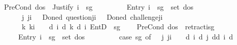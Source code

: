 \begin{isabellebody}
\ \ {\isacharbar}{\kern0pt}\ {\isachardoublequoteopen}PreCond\ dos\ {\isasymGamma}\ {\isacharparenleft}{\kern0pt}Justify\ i\ {\isasymPhi}\ sg\ {\isasymphi}{\isacharparenright}{\kern0pt}\ {\isacharequal}{\kern0pt}\isanewline
\ \ \ \ \ \ \ {\isacharparenleft}{\kern0pt}{\isacharparenleft}{\kern0pt}Entry\ i\ {\isasymphi}\ sg{\isacharparenright}{\kern0pt}\ {\isasymin}\ set\ dos\ {\isasymand}\isanewline
\ \ \ \ \ \ \ \ {\isacharparenleft}{\kern0pt}{\isasymexists}j{\isachardot}{\kern0pt}\ j{\isasymnoteq}i\ {\isasymand}\ {\isacharparenleft}{\kern0pt}{\isasymGamma}\ {\isacharparenleft}{\kern0pt}Done\isactrlsup d\ question{\isacharbrackleft}{\kern0pt}j{\isacharcomma}{\kern0pt}i{\isacharcomma}{\kern0pt}{\isasymphi}{\isacharbrackright}{\kern0pt}{\isacharparenright}{\kern0pt}\ {\isasymor}\ {\isasymGamma}\ {\isacharparenleft}{\kern0pt}Done\isactrlsup d\ challenge{\isacharbrackleft}{\kern0pt}j{\isacharcomma}{\kern0pt}i{\isacharcomma}{\kern0pt}{\isasymphi}{\isacharbrackright}{\kern0pt}{\isacharparenright}{\kern0pt}{\isacharparenright}{\kern0pt}{\isacharparenright}{\kern0pt}\ {\isasymand}\isanewline
\ \ \ \ \ \ \ \ {\isacharparenleft}{\kern0pt}{\isasymforall}k{\isachardot}{\kern0pt}\ k{\isasymnoteq}i\ {\isasymlongrightarrow}\ {\isasymGamma}\ {\isasymTurnstile}\ {\isasymD}\isactrlsup d\ i\ {\isacharparenleft}{\kern0pt}{\isasymB}\isactrlsup d\ k\ {\isacharparenleft}{\kern0pt}{\isasymB}\isactrlsup d\ i\ {\isacharparenleft}{\kern0pt}EntD\ {\isasymPhi}\ sg\ {\isasymphi}{\isacharparenright}{\kern0pt}{\isacharparenright}{\kern0pt}{\isacharparenright}{\kern0pt}{\isacharparenright}{\kern0pt}{\isacharparenright}{\kern0pt}{\isachardoublequoteclose}\isanewline
\ \ {\isacharbar}{\kern0pt}\ {\isachardoublequoteopen}PreCond\ dos\ {\isasymGamma}\ retract{\isacharbrackleft}{\kern0pt}i{\isacharcomma}{\kern0pt}{\isasymphi}{\isacharcomma}{\kern0pt}sg{\isacharbrackright}{\kern0pt}\ {\isacharequal}{\kern0pt}\isanewline
\ \ \ \ \ \ \ {\isacharparenleft}{\kern0pt}{\isacharparenleft}{\kern0pt}Entry\ i\ {\isasymphi}\ sg{\isacharparenright}{\kern0pt}\ {\isasymin}\ set\ dos\ {\isasymand}\isanewline
\ \ \ \ \ \ \ \ {\isacharparenleft}{\kern0pt}case\ sg\ of\ {\isasymoplus}\ {\isasymRightarrow}\ {\isacharparenleft}{\kern0pt}{\isasymforall}j{\isachardot}{\kern0pt}\ j{\isasymnoteq}i\ {\isasymlongrightarrow}\ {\isasymGamma}\ {\isasymTurnstile}\ {\isasymD}\isactrlsup d\ i\ {\isacharparenleft}{\kern0pt}{\isasymB}\isactrlsup d\ j\ {\isacharparenleft}{\kern0pt}{\isasymnot}\isactrlsup d{\isacharparenleft}{\kern0pt}{\isasymB}\isactrlsup d\ i\ {\isacharbraceleft}{\kern0pt}{\isasymphi}{\isacharbraceright}{\kern0pt}\isactrlsup d{\isacharparenright}{\kern0pt}{\isacharparenright}{\kern0pt}{\isacharparenright}{\kern0pt}{\isacharparenright}{\kern0pt}\isanewline

\end{isabellebody}

